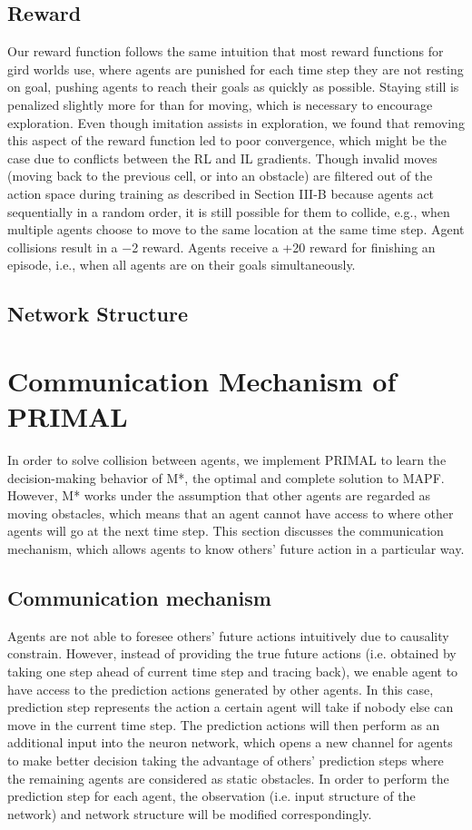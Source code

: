 \documentclass[sigconf,authordraft, nonacm=true]{acmart}
\begin{document}
\subsection{Reward}
Our reward function follows the same intuition that most reward functions for gird worlds use, where agents are punished for each time step they are not resting on goal, pushing agents to reach their goals as quickly as possible. Staying still is penalized slightly more for than for moving, which is necessary to encourage exploration. Even though imitation assists in exploration, we found that removing this aspect of the reward function led to poor convergence, which might be the case due to conflicts between the RL and IL gradients. Though invalid moves (moving back to the previous cell, or into an obstacle) are filtered out of the action space during training as described in Section III-B because agents act sequentially in a random order, it is still possible for them to collide, e.g., when multiple agents choose to move to the same location at the same time step. Agent collisions result in a −2 reward. Agents receive a +20 reward for finishing an episode, i.e., when all agents are on their goals simultaneously.

\subsection{Network Structure}

\section{Communication Mechanism of PRIMAL}

In order to solve collision between agents, we implement PRIMAL to learn the decision-making behavior of M*, the optimal and complete solution to MAPF. However, M* works under the assumption that other agents are regarded as moving obstacles, which means that an agent cannot have access to where other agents will go at the next time step. This section discusses the communication mechanism, which allows agents to know others’ future action in a particular way.
\subsection{Communication mechanism}
Agents are not able to foresee others’ future actions intuitively due to causality constrain. However, instead of providing the true future actions (i.e. obtained by taking one step ahead of current time step and tracing back), we enable agent to have access to the prediction actions generated by other agents. In this case, prediction step represents the action a certain agent will take if nobody else can move in the current time step. The prediction actions will then perform as an additional input into the neuron network, which opens a new channel for agents to make better decision taking the advantage of others’ prediction steps where the remaining agents are considered as static obstacles. In order to perform the prediction step for each agent, the observation (i.e. input structure of the network) and network structure will be modified correspondingly.  
\end{document}
